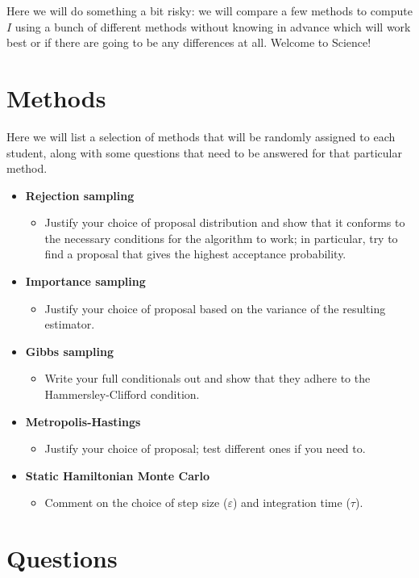 \documentclass[a4paper,10pt, notitlepage]{report}
\begin{document}
Here we will do something a bit risky: we will compare a few methods to compute $I$ using a bunch of different methods without knowing in advance which will work best or if there are going to be any differences at all.
Welcome to Science!


\section*{Methods}

Here we will list a selection of methods that will be randomly assigned to each student, along with some questions that need to be answered for that particular method.
\begin{itemize}
 \item \textbf{Rejection sampling}
  \begin{itemize}
  \item Justify your choice of proposal distribution and show that it conforms to the necessary conditions for the algorithm to work; in particular, try to find a proposal that gives the highest acceptance probability.
 \end{itemize}
  \item \textbf{Importance sampling}
 \begin{itemize}
  \item Justify your choice of proposal based on the variance of the resulting estimator.
 \end{itemize}
  \item \textbf{Gibbs sampling}
 \begin{itemize}
  \item Write your full conditionals out and show that they adhere to the Hammersley-Clifford condition.
 \end{itemize}
  \item \textbf{Metropolis-Hastings}
 \begin{itemize}
  \item Justify your choice of proposal; test different ones if you need to.
 \end{itemize}
 \item \textbf{Static Hamiltonian Monte Carlo}
 \begin{itemize}
  \item Comment on the choice of step size ($\varepsilon$) and integration time ($\tau$).
 \end{itemize}
\end{itemize}


\section*{Questions}
\end{document}
